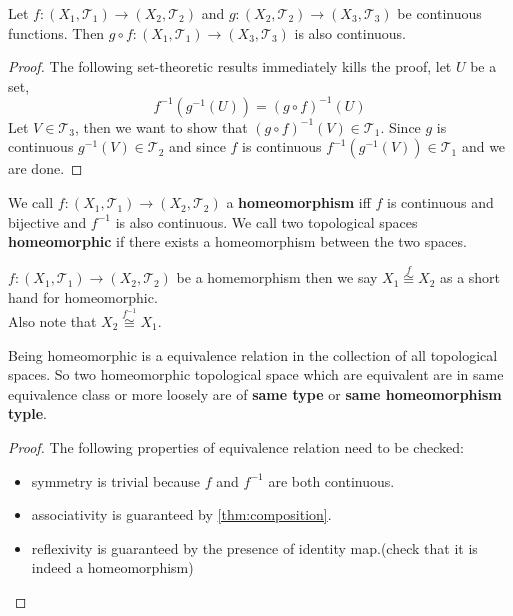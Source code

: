 \documentclass{scrartcl} %
\newcommand{\Tau}{\mathcal{T}}
\begin{document}
\newpage
\begin{theorem}\label{thm:composition}
Let $f : \left(X_1, \Tau_1\right) \rightarrow
\left(X_2, \Tau_2\right)$ and
$g : \left(X_2, \Tau_2\right) \rightarrow
\left(X_3, \Tau_3\right)$ be 
continuous functions. 
Then $g \circ f : \left(X_1, \Tau_1\right)
\rightarrow \left(X_3, \Tau_3\right)$ is also continuous.
\end{theorem}
\begin{proof}
The following set-theoretic results immediately kills the
proof, let $U$ be a set,
\[
	f^{-1}\left(g^{-1}(U)\right) = 
	\left(g \circ f\right)^{-1}(U)
\]
Let $V \in \Tau_3$, then we want to show that 
$\left(g \circ f\right)^{-1}(V) \in \Tau_1$. Since 
$g$ is continuous $g^{-1}(V) \in \Tau_2$ and since $f$ is continuous $f^{-1}\left(g^{-1}(V)\right) \in \Tau_1$ and 
we are done.
\end{proof}
\begin{definition}
We call $f : \left(X_1, \Tau_1\right) \rightarrow
\left(X_2, \Tau_2\right)$ a \textbf{homeomorphism} iff
$f$ is continuous and bijective and $f^{-1}$ is also
continuous. We call two topological spaces 
\textbf{homeomorphic} if there exists a homeomorphism
between the two spaces.
\end{definition}
\begin{remark}
$f : \left(X_1, \Tau_1\right) \rightarrow
\left(X_2, \Tau_2\right)$ be a homemorphism then we say $X_1 \overset{f}{\cong} X_2$ as a short hand for homeomorphic.\\
Also note that $X_2 \overset{f^{-1}}{\cong} X_1$. 
\end{remark}
\begin{remark}
Being homeomorphic is a equivalence relation in the 
collection of all topological spaces. So two homeomorphic topological space which are equivalent are in same 
equivalence class or more loosely are of \textbf{same type} or \textbf{same homeomorphism typle}.
\end{remark}
\begin{proof}
	The following properties of equivalence relation 
	need to be checked:
	\begin{itemize}
		\item symmetry is trivial because $f$ and
			$f^{-1}$ are both continuous.
		\item associativity is guaranteed by 
			\autoref{thm:composition}.
		\item reflexivity is guaranteed by the
			presence of identity map.(check that it is indeed a homeomorphism)
	\end{itemize}
\end{proof}
\end{document}

